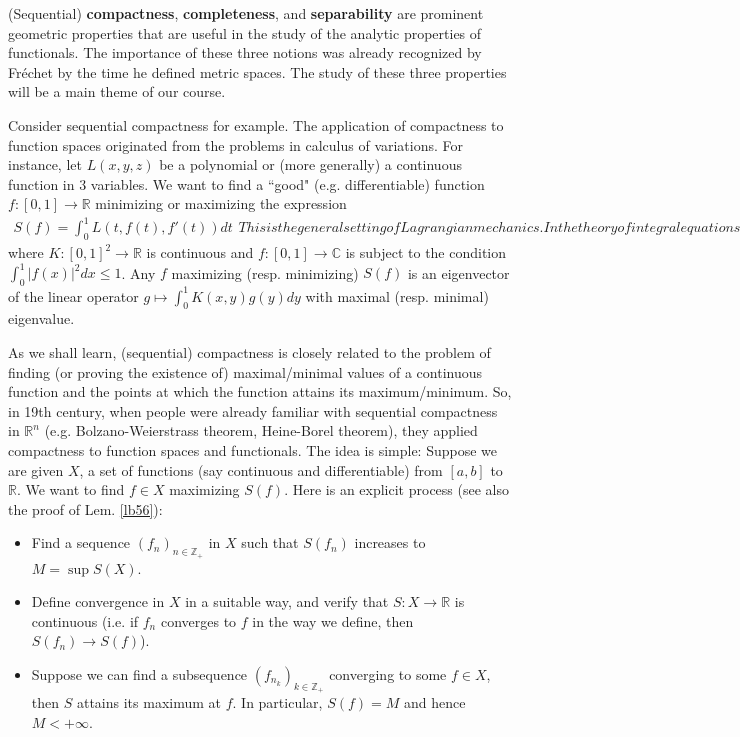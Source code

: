 \documentclass[12pt,b5paper,notitlepage]{article}
\theoremstyle{definition}
\theoremstyle{plain}
\newcommand{\ovl}{\overline}
\newcommand{\Cbb}{\mathbb C}
\newcommand{\Zbb}{\mathbb Z}
\newcommand{\Rbb}{\mathbb R}
\numberwithin{equation}{section}
\begin{document}
(Sequential) \textbf{compactness}, \textbf{completeness}, and \textbf{separability} are prominent geometric properties that are useful in the study of the analytic properties of functionals. The importance of these three notions  was  already recognized by Fr\'echet by the time he defined metric spaces. The study of these three properties will be a main theme of our course.


Consider sequential compactness for example. The application of compactness to function spaces originated from the problems in calculus of variations. For instance, let $L(x,y,z)$ be a polynomial or (more generally) a continuous function in $3$ variables. We want to find a ``good" (e.g. differentiable) function $f:[0,1]\rightarrow \Rbb$ minimizing or maximizing the expression
\begin{subequations}\label{eq24}
\begin{align}
S(f)=\int_0^1 L(t,f(t),f'(t))dt
\end{align}
This is the general setting of Lagrangian mechanics. In the theory of integral equations, one considers the extreme values and points of the functional
\begin{align}
S(f)=\int_0^1\int_0^1 f(x)K(x,y)\ovl{f(y)}dxdy  \label{eq206}
\end{align}
\end{subequations}
where $K:[0,1]^2\rightarrow\Rbb$ is continuous and $f:[0,1]\rightarrow\Cbb$ is subject to the condition $\int_0^1 |f(x)|^2dx\leq 1$. Any $f$ maximizing (resp. minimizing) $S(f)$ is an eigenvector of the linear operator $g\mapsto \int_0^1 K(x,y)g(y)dy$ with maximal (resp. minimal) eigenvalue.


As we shall learn, (sequential) compactness is closely related to the problem of finding (or proving the existence of) maximal/minimal values of a continuous function and the points at which the function attains its maximum/minimum. So, in 19th century, when people were already familiar with sequential compactness in $\Rbb^n$ (e.g. Bolzano-Weierstrass theorem, Heine-Borel theorem), they applied compactness to function spaces and functionals. The idea is simple: Suppose we are given $X$, a set of functions (say continuous and differentiable) from $[a,b]$ to $\Rbb$. We want to find $f\in X$ maximizing $S(f)$. Here is an explicit process (see also the proof of Lem. \ref{lb56}):
\begin{itemize}
\item[(A)] Find a sequence $(f_n)_{n\in\Zbb_+}$ in $X$ such that $S(f_n)$ increases to $M=\sup S(X)$. 
\item[(B)] Define convergence in $X$ in a suitable way, and verify that $S:X\rightarrow\Rbb$ is continuous (i.e. if $f_n$ converges to $f$ in the way we define, then $S(f_n)\rightarrow S(f)$). 
\item[(C)] Suppose we can find a subsequence $(f_{n_k})_{k\in\Zbb_+}$ converging to some $f\in X$, then $S$ attains its maximum at $f$. In particular, $S(f)=M$ and hence $M<+\infty$. 
\end{itemize}
\end{document}
